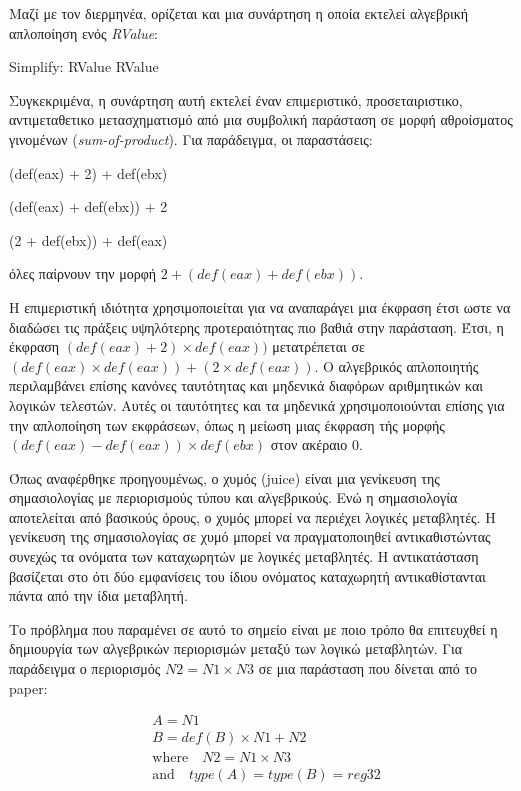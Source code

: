 Μαζί με τον διερμηνέα, ορίζεται και μια συνάρτηση η οποία εκτελεί αλγεβρική απλοποίηση ενός \emph{RValue}:

{\centering
	Simplify: RValue \rightarrow RValue \par
}

Συγκεκριμένα, η συνάρτηση αυτή εκτελεί έναν επιμεριστικό, προσεταιριστικο, αντιμεταθετικο μετασχηματισμό από μια συμβολική παράσταση σε μορφή αθροίσματος γινομένων (\emph{sum-of-product}). Για παράδειγμα, οι παραστάσεις:

{\centering
	(def(eax) + 2) + def(ebx)\par
}

{\centering
	(def(eax) + def(ebx)) + 2\par
}

{\centering
	(2 + def(ebx)) + def(eax)\par
}
\noindent όλες παίρνουν την μορφή $2 + (def(eax) + def(ebx))$.

Η επιμεριστική ιδιότητα χρησιμοποιείται για να αναπαράγει μια έκφραση έτσι ωστε να διαδώσει τις πράξεις υψηλότερης προτεραιότητας πιο βαθιά στην παράσταση.
Έτσι, η έκφραση $(def (eax) + 2) × def(eax))$ μετατρέπεται σε $(def(eax) × def(eax)) + (2 × def (eax))$.
Ο αλγεβρικός απλοποιητής περιλαμβάνει επίσης κανόνες ταυτότητας και μηδενικά διαφόρων αριθμητικών και λογικών τελεστών. Αυτές οι ταυτότητες και τα μηδενικά χρησιμοποιούνται επίσης για την απλοποίηση των εκφράσεων, όπως η μείωση μιας έκφραση τής μορφής $(def (eax) - def (eax)) × def (ebx)$ στον ακέραιο 0.

Όπως αναφέρθηκε προηγουμένως, ο χυμός (juice) είναι μια γενίκευση της σημασιολογίας με περιορισμούς τύπου και αλγεβρικούς.
Ενώ η σημασιολογία αποτελείται από βασικούς όρους, ο χυμός μπορεί να περιέχει λογικές μεταβλητές.
Η γενίκευση της σημασιολογίας σε χυμό μπορεί να πραγματοποιηθεί αντικαθιστώντας συνεχώς τα ονόματα των καταχωρητών με λογικές μεταβλητές.
Η αντικατάσταση βασίζεται στο ότι δύο εμφανίσεις του ίδιου ονόματος καταχωρητή αντικαθίστανται πάντα από την ίδια μεταβλητή.

\pagebreak
Το πρόβλημα που παραμένει σε αυτό το σημείο είναι με ποιο τρόπο θα επιτευχθεί η δημιουργία των αλγεβρικών περιορισμών μεταξύ των λογικώ μεταβλητών.
Για παράδειγμα ο περιορισμός $N2 = N1\times N3$ σε μια παράσταση που δίνεται από το paper:

\vspace{-30pt}
\begin{align*}
&A = N1 \\
&B = def(B)\times N1 + N2 \\
	&\textrm{where}\quad N2 = N1 \times N3 \\
			&\textrm{and}\quad type(A) = type(B) = reg32 \\
\end{align*}

